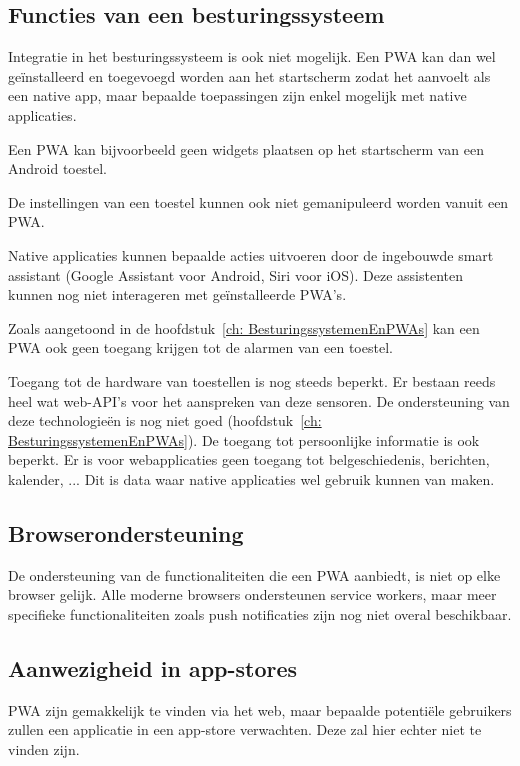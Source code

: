 	
\subsection{Functies van een besturingssysteem}

	Integratie in het besturingssysteem is ook niet mogelijk. Een PWA kan dan wel geïnstalleerd en toegevoegd worden aan het startscherm zodat het aanvoelt als een native app, maar bepaalde toepassingen zijn enkel mogelijk met native applicaties.
	
	Een PWA kan bijvoorbeeld geen widgets plaatsen op het startscherm van een Android toestel. 
	
	De instellingen van een toestel kunnen ook niet gemanipuleerd worden vanuit een PWA.
	
	Native applicaties kunnen bepaalde acties uitvoeren door de ingebouwde smart assistant (Google Assistant voor Android, Siri voor iOS). Deze assistenten kunnen nog niet interageren met geïnstalleerde PWA's.
	
	Zoals aangetoond in de hoofdstuk~\ref{ch: BesturingssystemenEnPWAs} kan een PWA ook geen toegang krijgen tot de alarmen van een toestel.
	
	Toegang tot de hardware van toestellen is nog steeds beperkt. Er bestaan reeds heel wat web-API's voor het aanspreken van deze sensoren. De ondersteuning van deze technologieën is nog niet goed (hoofdstuk~\ref{ch: BesturingssystemenEnPWAs}).
	De toegang tot persoonlijke informatie is ook beperkt. Er is voor webapplicaties geen toegang tot belgeschiedenis, berichten, kalender, ... Dit is data waar native applicaties wel gebruik kunnen van maken.
	\autocite{Brousek2017}
	
\subsection{Browserondersteuning}

	De ondersteuning van de functionaliteiten die een PWA aanbiedt, is niet op elke browser gelijk. Alle moderne browsers ondersteunen service workers, maar meer specifieke functionaliteiten zoals push notificaties zijn nog niet overal beschikbaar.
	
	
	
\subsection{Aanwezigheid in app-stores}
	PWA zijn gemakkelijk te vinden via het web, maar bepaalde potentiële gebruikers zullen een applicatie in een app-store verwachten. Deze zal hier echter niet te vinden zijn.
	
